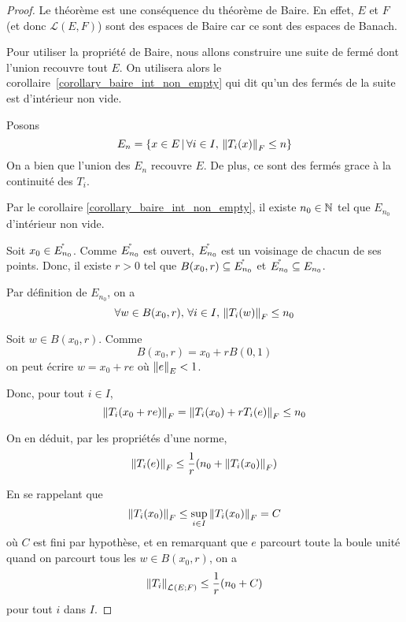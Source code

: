 \ifdefined\outputproof
\begin{proof}
	Le théorème est une conséquence du théorème de Baire. En effet, $E$ et $F$
	(et donc $\mathcal{L}(E, F)$) sont des espaces de Baire car ce sont des
	espaces de Banach.

	Pour utiliser la propriété de Baire, nous allons construire une suite de
	fermé dont l'union recouvre tout $E$. On utilisera alors le
	corollaire~\ref{corollary_baire_int_non_empty} qui dit qu'un des fermés de
	la suite est d'intérieur non vide.

	Posons
	\begin{equation}
		E_{n} = \left\{x \in E \, | \, \forall i \in I, \, \norm{T_{i}(x)}_{F} \leq n \right\}
	\end{equation}
	On a bien que l'union des $E_{n}$ recouvre $E$. De plus, ce sont des fermés
	grace à la continuité des $T_{i}$.

	Par le corollaire \ref{corollary_baire_int_non_empty}, il existe $n_{0} \in
	\mathbb{N}$ tel que $E_{n_{0}}$ d'intérieur non vide.

	Soit $x_{0} \in \mathring{E_{n_{0}}}$.
	Comme $\mathring{E_{n_{0}}}$ est ouvert, $\mathring{E_{n_{0}}}$ est un
	voisinage de chacun de ses points. Donc, il existe $r > 0$ tel que
	$B(x_{0}, r) \subseteq \mathring{E_{n_{0}}}$ et $\mathring{E_{n_{0}}} \subseteq
	E_{n_{0}}$.

	Par définition de $E_{n_{0}}$, on a
	\begin{equation}
		\forall w \in B(x_{0}, r), \, \forall i \in I, \,
		\norm{T_{i}(w)}_{F} \leq n_{0}
	\end{equation}

	Soit $w \in B(x_{0}, r)$. Comme
	\begin{equation}
		B(x_{0}, r) = x_{0} + r B(0, 1)
	\end{equation}
	on peut écrire $w = x_{0} + r e$ où $\norm{e}_{E} < 1$.

	Donc, pour tout $i \in I$,
	\begin{equation}
		\norm{T_{i}(x_{0} + re)}_{F} = \norm{T_{i}(x_{0}) +
		r T_{i}(e)}_{F} \leq n_{0}
	\end{equation}

	On en déduit, par les propriétés d'une norme,
	\begin{equation}
		\norm{T_{i}(e)}_{F} \leq \frac{1}{r} (n_{0} +
		\norm{T_{i}(x_{0})}_{F})
	\end{equation}

	En se rappelant que
	\begin{equation}
		\norm{T_{i}(x_{0})}_{F} \leq \sup_{i \in I}
		\norm{T_{i}(x_{0})}_{F} = C
	\end{equation}
	où $C$ est fini par hypothèse, et en remarquant que $e$ parcourt toute
	la boule unité quand on parcourt tous les $w \in B(x_{0}, r)$, on a
	\begin{equation}
		\norm{T_{i}}_{\mathcal{L}_{}(E; F)} \leq \frac{1}{r} (n_{0} + C)
	\end{equation}
	pour tout $i$ dans $I$.


\end{proof}
